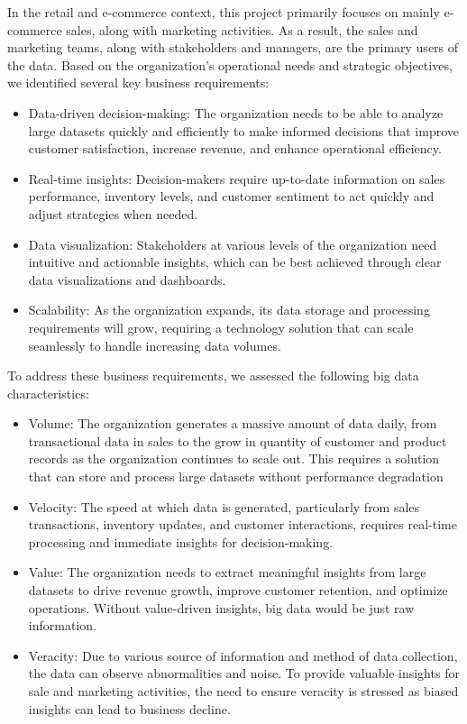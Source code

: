 In the retail and e-commerce context, this project primarily focuses on mainly e-commerce sales, along with marketing activities. 
As a result, the sales and marketing teams, along with stakeholders and managers, are the primary users of the data.
Based on the organization’s operational needs and strategic objectives, we identified several key business
requirements:
\begin{itemize}
    \item 
Data-driven decision-making: The organization needs to be able to analyze large datasets quickly and efficiently to make 
informed decisions that improve customer satisfaction, increase revenue, and enhance operational efficiency.
\item Real-time insights: Decision-makers require up-to-date information on sales performance, inventory levels, and customer
sentiment to act quickly and adjust strategies when needed.
\item Data visualization: Stakeholders at various levels of the organization need intuitive and actionable insights, which 
can be best achieved through clear data visualizations and dashboards.
\item Scalability: As the organization expands, its data storage and processing requirements will grow, requiring a technology
solution that can scale seamlessly to handle increasing data volumes.
\end{itemize}
To address these business requirements, we assessed the following big data characteristics:
\begin{itemize}
\item Volume: The organization generates a massive amount of data daily, from transactional data in sales to the grow in quantity
of customer and product records as the organization continues to scale out. This requires a solution that can store and process
large datasets without performance degradation
\item Velocity: The speed at which data is generated, particularly from sales transactions, inventory updates, and customer
 interactions, requires real-time processing and immediate insights for decision-making.
\item Value: The organization needs to extract meaningful insights from large datasets to drive revenue growth, improve
customer retention, and optimize operations. Without value-driven insights, big data would be just raw information.
\item Veracity: Due to various source of information and method of data collection, the data can observe abnormalities and
noise. To provide valuable insights for sale and marketing activities, the need to ensure veracity is stressed as biased 
insights can lead to business decline.
\end{itemize}
\newpage
